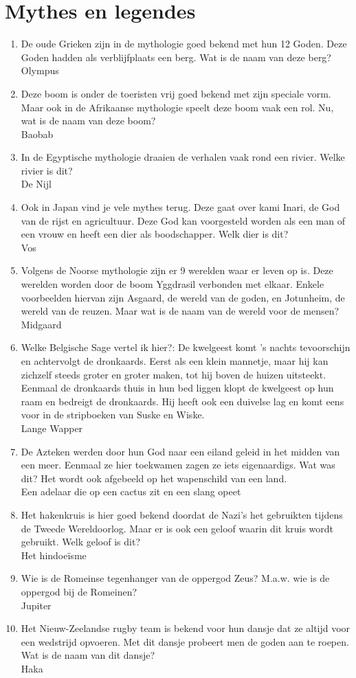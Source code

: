 \section{Mythes en legendes}
\begin{enumerate}
\item{De oude Grieken zijn in de mythologie goed bekend met hun 12 Goden. Deze Goden hadden als verblijfplaats een berg. Wat is de naam van deze berg?\\ Olympus}
\item{Deze boom is onder de toeristen vrij goed bekend met zijn speciale vorm. Maar ook in de Afrikaanse mythologie speelt deze boom vaak een rol. Nu, wat is de naam van deze boom?\\ Baobab}
\item{In de Egyptische mythologie draaien de verhalen vaak rond een rivier. Welke rivier is dit?\\ De Nijl}
\item{Ook in Japan vind je vele mythes terug. Deze gaat over kami Inari, de God van de rijst en agricultuur. Deze God kan voorgesteld worden als een man of een vrouw en heeft een dier als boodschapper. Welk dier is dit?\\ Vos}
\item{Volgens de Noorse mythologie zijn er 9 werelden waar er leven op is. Deze werelden worden door de boom Yggdrasil verbonden met elkaar. Enkele voorbeelden hiervan zijn Asgaard, de wereld van de goden, en Jotunheim, de wereld van de reuzen. Maar wat is de naam van de wereld voor de mensen?\\ Midgaard}
\item{Welke Belgische Sage vertel ik hier?: De kwelgeest komt 's nachts tevoorschijn en achtervolgt de dronkaards. Eerst als een klein mannetje, maar hij kan zichzelf steeds groter en groter maken, tot hij boven de huizen uitsteekt. Eenmaal de dronkaards thuis in hun bed liggen klopt de kwelgeest op hun raam en bedreigt de dronkaards. Hij heeft ook een duivelse lag en komt eens voor in de stripboeken van Suske en Wiske.\\ Lange Wapper}
\newpage
\item{De Azteken werden door hun God naar een eiland geleid in het midden van een meer. Eenmaal ze hier toekwamen zagen ze iets eigenaardigs. Wat was dit? Het wordt ook afgebeeld op het wapenschild van een land.\\ Een adelaar die op een cactus zit en een slang opeet}
\item{Het hakenkruis is hier goed bekend doordat de Nazi's het gebruikten tijdens de Tweede Wereldoorlog. Maar er is ook een geloof waarin dit kruis wordt gebruikt. Welk geloof is dit?\\ Het hindoeïsme}
\item{Wie is de Romeinse tegenhanger van de oppergod Zeus? M.a.w. wie is de oppergod bij de Romeinen?\\ Jupiter}
\item{Het Nieuw-Zeelandse rugby team is bekend voor hun dansje dat ze altijd voor een wedstrijd opvoeren. Met dit dansje probeert men de goden aan te roepen. Wat is de naam van dit dansje?\\ Haka}
\end{enumerate}